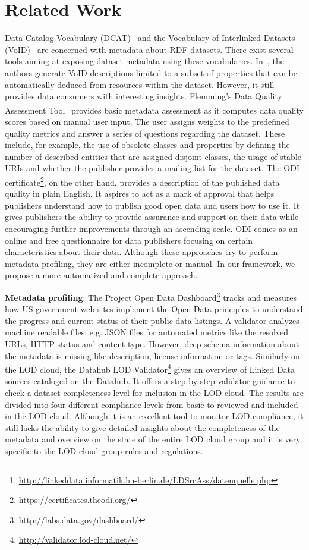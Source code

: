 \section{Related Work}
\label{section:roomba-related-work}
Data Catalog Vocabulary (DCAT)~\cite{Erickson:DCV:14} and the Vocabulary of Interlinked Datasets (VoID)~\cite{Cyganiak:W3C:11} are concerned with metadata about RDF datasets. There exist several tools aiming at exposing dataset metadata using these vocabularies. In~\cite{Bohm:WebSemJournal:11}, the authors generate VoID descriptions limited to a subset of properties that can be automatically deduced from resources within the dataset. However, it still provides data consumers with interesting insights. Flemming's Data Quality Assessment Tool\footnote{\url{http://linkeddata.informatik.hu-berlin.de/LDSrcAss/datenquelle.php}} provides basic metadata assessment as it computes data quality scores based on manual user input. The user assigns weights to the predefined quality metrics and answer a series of questions regarding the dataset. These include, for example, the use of obsolete classes and properties by defining the number of described entities that are assigned disjoint classes, the usage of stable URIs and whether the publisher provides a mailing list for the dataset. The ODI certificate\footnote{\url{https://certificates.theodi.org/}}, on the other hand, provides a description of the published data quality in plain English. It aspires to act as a mark of approval that helps publishers understand how to publish good open data and users how to use it. It gives publishers the ability to provide assurance and support on their data while encouraging further improvements through an ascending scale. ODI comes as an online and free questionnaire for data publishers focusing on certain characteristics about their data. Although these approaches try to perform metadata profiling, they are either incomplete or manual. In our framework, we propose a more automatized and complete approach.

\textbf{Metadata profiling}: The Project Open Data Dashboard\footnote{\url{http://labs.data.gov/dashboard/}} tracks and measures how US government web sites implement the Open Data principles to understand the progress and current status of their public data listings. A validator analyzes machine readable files: e.g. JSON files for automated metrics like the resolved URLs, HTTP status and content-type. However, deep schema information about the metadata is missing like description, license information or tags. Similarly on the LOD cloud, the Datahub LOD Validator\footnote{\url{http://validator.lod-cloud.net/}} gives an overview of Linked Data sources cataloged on the Datahub. It offers a step-by-step validator guidance to check a dataset completeness level for inclusion in the LOD cloud. The results are divided into four different compliance levels from basic to reviewed and included in the LOD cloud. Although it is an excellent tool to monitor LOD compliance, it still lacks the ability to give detailed insights about the completeness of the metadata and overview on the state of the entire LOD cloud group and it is very specific to the LOD cloud group rules and regulations.

